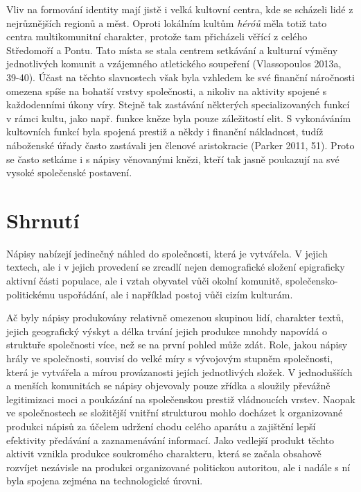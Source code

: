 Vliv na formování identity mají jistě i velká kultovní centra, kde se scházeli lidé z nejrůznějších regionů a měst. Oproti lokálním kultům {\em héróů} měla totiž tato centra multikomunitní charakter, protože tam přicházeli věřící z celého Středomoří a Pontu. Tato místa se stala centrem setkávání a kulturní výměny jednotlivých komunit a vzájemného atletického soupeření (Vlassopoulos 2013a, 39-40). Účast na těchto slavnostech však byla vzhledem ke své finanční náročnosti omezena spíše na bohatší vrstvy společnosti, a nikoliv na aktivity spojené s každodenními úkony víry. Stejně tak zastávání některých specializovaných funkcí v rámci kultu, jako např. funkce kněze byla pouze záležitostí elit. S vykonáváním kultovních funkcí byla spojená prestiž a někdy i finanční nákladnost, tudíž náboženské úřady často zastávali jen členové aristokracie (Parker 2011, 51). Proto se často setkáme i s nápisy věnovanými knězi, kteří tak jasně poukazují na své vysoké společenské postavení.

\section[shrnutí]{Shrnutí}

Nápisy nabízejí jedinečný náhled do společnosti, která je vytvářela. V jejich textech, ale i v jejich provedení se zrcadlí nejen demografické složení epigraficky aktivní části populace, ale i vztah obyvatel vůči okolní komunitě, společensko-politickému uspořádání, ale i například postoj vůči cizím kulturám.

Ač byly nápisy produkovány relativně omezenou skupinou lidí, charakter textů, jejich geografický výskyt a délka trvání jejich produkce mnohdy napovídá o struktuře společnosti více, než se na první pohled může zdát. Role, jakou nápisy hrály ve společnosti, souvisí do velké míry s vývojovým stupněm společnosti, která je vytvářela a mírou provázanosti jejích jednotlivých složek. V jednodušších a menších komunitách se nápisy objevovaly pouze zřídka a sloužily převážně legitimizaci moci a poukázání na společenskou prestiž vládnoucích vrstev. Naopak ve společnostech se složitější vnitřní strukturou mohlo docházet k organizované produkci nápisů za účelem udržení chodu celého aparátu a zajištění lepší efektivity předávání a zaznamenávání informací. Jako vedlejší produkt těchto aktivit vznikla produkce soukromého charakteru, která se začala obsahově rozvíjet nezávisle na produkci organizované politickou autoritou, ale i nadále s ní byla spojena zejména na technologické úrovni.

